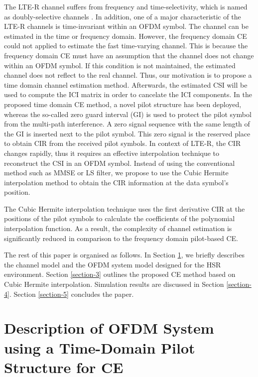 \documentclass[12pt,journal,draftclsnofoot,onecolumn]{IEEEtran}
\begin{document}
The LTE-R channel suffers from frequency and time-selectivity, which is named as doubly-selective channels \cite{Adireddy2002,Fan2014}. In addition, one of a major characteristic of the LTE-R channels is time-invariant within an OFDM symbol. The channel can be estimated in the time or frequency domain. However, the frequency domain CE could not applied to estimate the fast time-varying channel. This is because the frequency  domain CE must have an assumption that the channel does not change within an OFDM symbol. If this condition is not maintained, the estimated channel does not reflect to the real channel. Thus, our motivation is to propose a time domain channel estimation method. Afterwards, the estimated CSI will be used to compute the ICI matrix in order to cancelate the ICI components. In the proposed time domain CE method, a novel pilot structure has been deployed, whereas the so-called zero guard interval (GI) is used to protect the pilot symbol from the multi-path interference. A zero signal sequence with the same length of the GI is inserted next to the pilot symbol. This zero signal is the reserved place  to obtain CIR from the received pilot symbols. In context of LTE-R, the CIR changes rapidly, thus it requires an effective interpolation technique to reconstruct the CSI in an OFDM symbol. Instead of using the conventional method such as MMSE or LS filter, we propose to use the Cubic Hermite interpolation method to obtain the CIR information at the data symbol's position.

The Cubic Hermite interpolation technique  uses the first derivative CIR at  the positions of the pilot symbols to calculate the coefficients of the polynomial interpolation function. As a result, the complexity of channel estimation is significantly reduced in comparison to the frequency domain pilot-based CE. 

	
The rest of this paper is organised as follows. In Section \ref{section-2}, we briefly describes the channel model and the OFDM system model designed for the HSR environment. Section \ref{section-3} outlines the proposed CE method based on Cubic Hermite interpolation. Simulation results are discussed in Section \ref{section-4}. Section \ref{section-5} concludes the paper.
	
	
\section{Description of OFDM System using a Time-Domain Pilot Structure for CE}\label{section-2}
	
\end{document}
